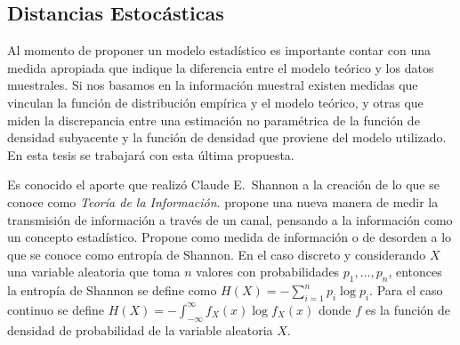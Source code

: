 %




\subsection{Distancias Estocásticas}

Al momento de proponer un modelo estadístico es importante contar con una medida apropiada que indique la diferencia entre el modelo teórico y los datos muestrales. Si nos basamos en la información muestral existen medidas que vinculan la función de distribución empírica y el modelo teórico, y otras que miden la discrepancia entre una estimación no paramétrica de la función de densidad subyacente y la función de densidad que proviene del modelo utilizado. En esta tesis se trabajará con esta última propuesta.

Es conocido el aporte que realizó Claude E.\ Shannon a la creaci\'on de lo que se conoce como \textit{Teoría de la Información}. \citet{Shannon1948} propone una nueva manera de medir la transmisi\'on de informaci\'on a trav\'es de un canal, pensando a la informaci\'on como un concepto estad\'istico. Propone como medida de informaci\'on o de desorden a lo que se conoce como entrop\'ia de Shannon. En el caso discreto y considerando $X$ una variable aleatoria que toma $n$ valores con probabilidades $p_1,\ldots,p_n$, entonces la entrop\'ia de Shannon se define como $H(X)=-\sum_{i=1}^n p_i \log p_i$. Para el caso continuo se define $H(X)=-\int_{-\infty}^{\infty} f_X(x) \log f_X(x)$ donde $f$ es la función de densidad de probabilidad de la variable aleatoria $X$.

